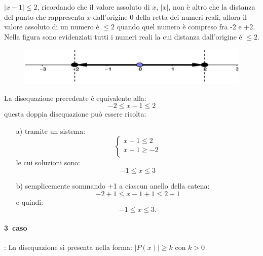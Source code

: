 \begin{esempio}  $|x-1|\leq 2$, ricordando che il valore 
assoluto di $x$, $|x|$, non è altro che la distanza del punto che rappresenta 
$x$ dall'origine 0 della retta dei numeri reali, allora il valore assoluto di 
un 
numero è $\leq 2$ quando quel numero è compreso fra -2 e +2.\\
        Nella figura sono evidenziati tutti i numeri reali la cui distanza 
dall'origine è $\leq 2$.

\begin{figure}[h]
\begin{inaccessibleblock}[TODO]
\centering
\includegraphics[width=0.9\linewidth]{img/imm4} %
\end{inaccessibleblock}
\label{fig:abs_imm4}
\end{figure}

La disequazione precedente è equivalente alla:
$$-2\leq x-1 \leq 2$$
questa doppia disequazione può essere risolta:
\begin{enumerate}
  \item [a)] tramite un sistema:
    $$
    \left\lbrace 
    \begin{array}{l}
    x-1\leq 2\\
    x-1\geq -2\\
    \end{array}
    \right.
    $$
    le cui soluzioni sono:
    $$-1\leq x \leq 3$$
  \item [b)] semplicemente sommando +1 a ciascun anello della catena:
    $$-2+1\leq x-1+1 \leq 2+1$$
    e quindi:
    $$-1\leq x \leq 3.$$
\end{enumerate}
\end{esempio}

\paragraph{3\textdegree~caso}: La disequazione si presenta nella forma:  
$|P(x)|\geq k$ con $k> 0$\\

